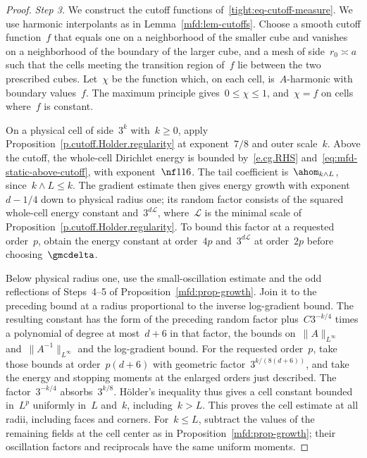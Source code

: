 \documentclass[11pt]{amsart}
\begin{document}
\begin{proof}
\smallskip

\emph{Step 3.} We construct the cutoff functions of~\eqref{tight:eq-cutoff-measure}. We use harmonic interpolants as in Lemma~\ref{mfd:lem-cutoffs}. Choose a smooth cutoff function~$f$ that equals one on a neighborhood of the smaller cube and vanishes on a neighborhood of the boundary of the larger cube, and a mesh of side~$r_0\asymp a$ such that the cells meeting the transition region of~$f$ lie between the two prescribed cubes. Let~$\chi$ be the function which, on each cell, is~$A$-harmonic with boundary values~$f$. The maximum principle gives~$0\leq\chi\leq1$, and~$\chi=f$ on cells where~$f$ is constant.

\smallskip

On a physical cell of side~$3^k$ with~$k\geq0$, apply Proposition~\ref{p.cutoff.Holder.regularity} at exponent~$7/8$ and outer scale~$k$. Above the cutoff, the whole-cell Dirichlet energy is bounded by~\eqref{e.cg.RHS} and~\eqref{eq:mfd-static-above-cutoff}, with exponent~$\nf1{16}$. The tail coefficient is~$\ahom_{k\wedge L}$, since~$k\wedge L\leq k$. The gradient estimate then gives energy growth with exponent~$d-1/4$ down to physical radius one; its random factor consists of the squared whole-cell energy constant and~$3^{d\mathcal L}$, where~$\mathcal L$ is the minimal scale of Proposition~\ref{p.cutoff.Holder.regularity}. To bound this factor at a requested order~$p$, obtain the energy constant at order~$4p$ and~$3^{d\mathcal L}$ at order~$2p$ before choosing~$\gmcdelta$.

\smallskip

Below physical radius one, use the small-oscillation estimate and the odd reflections of Steps~4--5 of Proposition~\ref{mfd:prop-growth}. Join it to the preceding bound at a radius proportional to the inverse log-gradient bound. The resulting constant has the form of the preceding random factor plus~$C3^{-k/4}$ times a polynomial of degree at most~$d+6$ in that factor, the bounds on~$\|A\|_{L^\infty}$ and~$\|A^{-1}\|_{L^\infty}$ and the log-gradient bound. For the requested order~$p$, take those bounds at order~$p(d+6)$ with geometric factor~$3^{k/(8(d+6))}$, and take the energy and stopping moments at the enlarged orders just described. The factor~$3^{-k/4}$ absorbs~$3^{k/8}$. H\"older's inequality thus gives a cell constant bounded in~$L^p$ uniformly in~$L$ and~$k$, including~$k>L$. This proves the cell estimate at all radii, including faces and corners. For~$k\leq L$, subtract the values of the remaining fields at the cell center as in Proposition~\ref{mfd:prop-growth}; their oscillation factors and reciprocals have the same uniform moments.


\end{proof}
\end{document}
